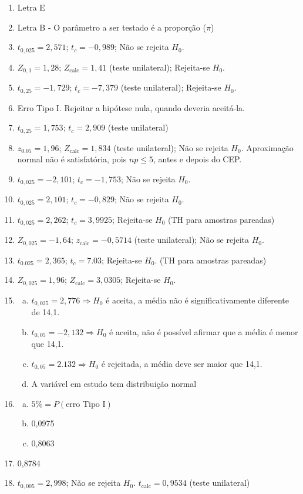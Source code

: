 \documentclass[12pt, a4paper]{article}
\begin{document}
\begin{enumerate}
    \item Letra E
    \item Letra B - O parâmetro a ser testado é a proporção ($\pi$)
    \item $t_{0,025}=2,571$; $t_{c}=-0,989$; Não se rejeita $H_{0}$.
    \item $Z_{0,1}=1,28$; $Z_{\text{calc}}=1,41$ (teste unilateral); Rejeita-se $H_{0}$.
    \item $t_{0,25}=-1,729$; $t_{c}=-7,379$ (teste unilateral); Rejeita-se $H_{0}.$
    \item Erro Tipo I. Rejeitar a hipótese nula, quando deveria aceitá-la.
    \item $t_{0,25}=1,753$; $t_{c}=2,909$ (teste unilateral)
    \item $z_{0.05}=1,96$; $Z_{\text{calc}}=1,834$ (teste unilateral); Não se rejeita $H_0$. Aproximação normal não é satisfatória, pois $np \le 5$, antes e depois do CEP.
    \item $t_{0,025}=-2,101$; $t_{c}=-1,753$; Não se rejeita $H_0$.
    \item $t_{0,025}=2,101$; $t_{c}=-0,829$; Não se rejeita $H_0$.
    \item $t_{0,025}=2,262$; $t_{c}=3,9925$; Rejeita-se $H_{0}$ (TH para amostras pareadas)
    \item $Z_{0,025}=-1,64$; $z_{\text{calc}}=-0,5714$ (teste unilateral); Não se rejeita $H_0$.
    \item $t_{0.025}=2,365$; $t_{c}=7.03$; Rejeita-se $H_{0}$. (TH para amostras pareadas)
    \item $Z_{0,025}=1,96$; $Z_{\text{calc}}=3,0305$; Rejeita-se $H_0$.
    \item
    \begin{enumerate}[a)]
        \item $t_{0,025}=2,776 \Rightarrow H_{0}$ é aceita, a média não é significativamente diferente de 14,1.
        \item $t_{0,05}=-2,132 \Rightarrow H_{0}$ é aceita, não é possível afirmar que a média é menor que 14,1.
        \item $t_{0,05}=2.132 \Rightarrow H_{0}$ é rejeitada, a média deve ser maior que 14,1.
        \item A variável em estudo tem distribuição normal
    \end{enumerate}
    \item
    \begin{enumerate}[a)]
        \item $5\%=P(\text{erro Tipo I})$
        \item 0,0975
        \item 0,8063
    \end{enumerate}
    \item 0,8784
    \item $t_{0,005}=2,998$; Não se rejeita $H_{0}$. $t_{\text{calc}}=0,9534$ (teste unilateral)
\end{enumerate}
\end{document}
